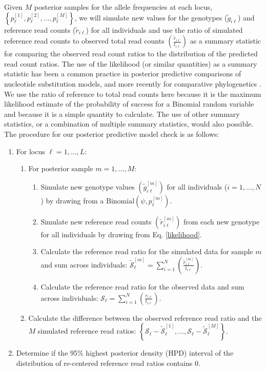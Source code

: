 \documentclass[11pt,english,letterpaper,oneside]{article}
\begin{document}
Given $M$ posterior samples for the allele frequencies at each locus, $\left\{p_{\ell}^{[1]},p_{\ell}^{[2]},\ldots,p_{\ell}^{[M]} \right\}$, we will simulate new values for the genotypes ($\tilde{g}_{i \ell}$) and reference read counts ($\tilde{r}_{i \ell}$) for all individuals and use the ratio of simulated reference read counts to observed total read counts $\left( \frac{\tilde{r}_{i \ell}}{t_{i \ell}} \right) $ as a summary statistic for comparing the observed read count ratios to the distribution of the predicted read count ratios. The use of the likelihood (or similar quantities) as a summary statistic has been a common practice in posterior predictive comparisons of nucleotide substitution models, and more recently for comparative phylogenetics \citep{ripplinger2010DNAmodels,reid2014poorfit,pennell2015adequacy}. We use the ratio of reference to total read counts here because it is the maximum likelihood estimate of the probability of success for a Binomial random variable and because it is a simple quantity to calculate. The use of other summary statistics, or a combination of multiple summary statistics, would also possible. The procedure for our posterior predictive model check is as follows:
\medskip

\begin{enumerate}
  \item For locus $\ell = 1,\ldots,L$:
  \begin{enumerate}[label={\arabic{enumi}.\arabic*.}]
    \item For posterior sample $m = 1,\ldots,M$:
    \begin{enumerate}[label={\arabic{enumi}.\arabic{enumi}.\arabic*.}]
      \item Simulate new genotype values $\left( \tilde{g}_{i \ell}^{[m]}\right)$ for all individuals ($i = 1,\ldots,N$) by drawing from a $\text{Binomial}\left( \psi,p_{\ell}^{[m]} \right)$.
      \item Simulate new reference read counts $\left( \tilde{r}_{i \ell}^{[m]} \right)$ from each new genotype for all individuals by drawing from Eq. \ref{likelihood}.
      \item Calculate the reference read ratio for the simulated data for sample $m$ and sum across individuals: $\mathcal{\tilde{S}}_{\ell}^{[m]} = \sum_{i=1}^{N} \left(\frac{\tilde{r}_{i \ell}^{[m]}}{t_{i \ell}} \right)$.
      \item Calculate the reference read ratio for the observed data and sum across individuals: $\mathcal{S}_{\ell} = \sum_{i=1}^{N} \left(\frac{r_{i \ell}}{t_{i \ell}} \right)$.
    \end{enumerate}
    \item Calculate the difference between the observed reference read ratio and the $M$ simulated reference read ratios: $\left\{ \mathcal{S}_{\ell}-\mathcal{\tilde{S}}_{\ell}^{[1]},\ldots,\mathcal{S}_{\ell}-\mathcal{\tilde{S}}_{\ell}^{[M]}\right\}$.
\end{enumerate}
\item Determine if the 95\% highest posterior density (HPD) interval of the distribution of re-centered reference read ratios contains 0.
\end{enumerate}
\medskip
\end{document}
